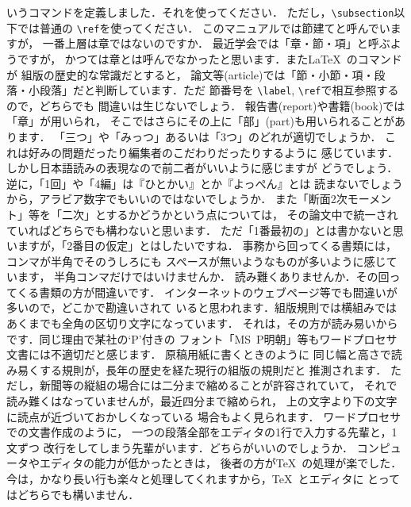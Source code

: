\documentclass[dvipdfmx,onecolumn]{jsce}  %
\begin{document}
\begin{Enumerate}
いうコマンドを定義しました．それを使ってください．
ただし，\verb+\subsection+以下では普通の \verb+\ref+を使ってください．
%
\Qitem このマニュアルでは節建てと呼んでいますが，
一番上層は章ではないのですか．
\Aitem 最近学会では「章・節・項」と呼ぶようですが，
かつては章とは呼んでなかったと思います．また\LaTeX\ のコマンドが
組版の歴史的な常識だとすると，
論文等(article)では「節・小節・項・段落・小段落」だと判断しています．ただ
節番号を \verb+\label+, \verb+\ref+で相互参照するので，どちらでも
間違いは生じないでしょう．
報告書(report)や書籍(book)では「章」が用いられ，
そこではさらにその上に「部」(part)も用いられることがあります．
%
\Qitem 「三つ」や「みっつ」あるいは「3つ」のどれが適切でしょうか．
\Aitem これは好みの問題だったり編集者のこだわりだったりするように
感じています．しかし日本語読みの表現なので前二者がいいように感じますが
どうでしょう．
逆に，「1回」や「4編」は『ひとかい』とか『よっぺん』とは
読まないでしょうから，アラビア数字でもいいのではないでしょうか．
また「断面2次モーメント」等を「二次」とするかどうかという点については，
その論文中で統一されていればどちらでも構わないと思います．
ただ「1番最初の」とは書かないと思いますが，「2番目の仮定」とはしたいですね．
%
\Qitem 事務から回ってくる書類には，コンマが半角でそのうしろにも
スペースが無いようなものが多いように感じています，
半角コンマだけではいけませんか．
\Aitem 読み難くありませんか．その回ってくる書類の方が間違いです．
インターネットのウェブページ等でも間違いが多いので，どこかで勘違いされて
いると思われます．組版規則では横組みでは
あくまでも全角の区切り文字になっています．
それは，その方が読み易いからです．同じ理由で某社の`P'付きの
フォント「MS~P\mbox{}明朝」等もワードプロセサ文書には不適切だと感じます．
原稿用紙に書くときのように
同じ幅と高さで読み易くする規則が，長年の歴史を経た現行の組版の規則だと
推測されます．
ただし，新聞等の縦組の場合には二分まで縮めることが許容されていて，
それで読み難くはなっていませんが，最近四分まで縮められ，
上の文字より下の文字に読点が近づいておかしくなっている
場合もよく見られます．
%
\Qitem ワードプロセサでの文書作成のように，
一つの段落全部をエディタの1行で入力する先輩と，1文ずつ
改行をしてしまう先輩がいます．どちらがいいのでしょうか．
\Aitem コンピュータやエディタの能力が低かったときは，
後者の方が\TeX\ の処理が楽でした．
今は，かなり長い行も楽々と処理してくれますから，\TeX\ とエディタに
とってはどちらでも構いません．


\end{Enumerate}
\end{document}
